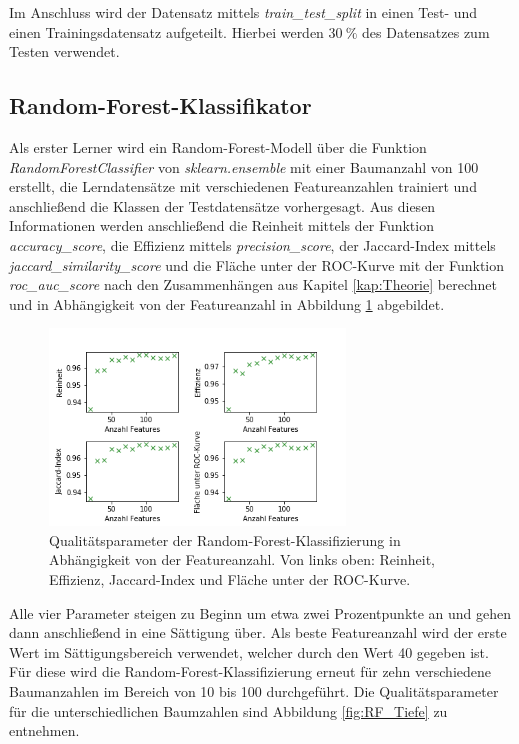 Im Anschluss wird der Datensatz mittels \textit{train\_test\_split} in einen Test- und einen Trainingsdatensatz aufgeteilt. Hierbei werden $\SI{30}{\%}$ des Datensatzes zum Testen verwendet.

\subsection{Random-Forest-Klassifikator}
Als erster Lerner wird ein Random-Forest-Modell über die Funktion \textit{RandomForestClassifier} von \textit{sklearn.ensemble} mit einer Baumanzahl von 100 erstellt, die Lerndatensätze mit verschiedenen Featureanzahlen trainiert und anschließend die Klassen der Testdatensätze vorhergesagt. Aus diesen Informationen werden anschließend die Reinheit mittels der Funktion \textit{accuracy\_score}, die Effizienz mittels \textit{precision\_score}, der Jaccard-Index mittels \textit{jaccard\_similarity\_score} und die Fläche unter der ROC-Kurve mit der Funktion \textit{roc\_auc\_score} nach den Zusammenhängen aus Kapitel \ref{kap:Theorie} berechnet und in Abhängigkeit von der Featureanzahl in Abbildung \ref{fig:RF_Feat} abgebildet.
\begin{figure}
    \centering
    \includegraphics[width=0.7\textwidth]{plots/RF_featurezahl.png}
    \caption{Qualitätsparameter der Random-Forest-Klassifizierung in Abhängigkeit von der Featureanzahl. Von links oben: Reinheit, Effizienz, Jaccard-Index und Fläche unter der ROC-Kurve.}
    \label{fig:RF_Feat}
  \end{figure}
  \FloatBarrier
  Alle vier Parameter steigen zu Beginn um etwa zwei Prozentpunkte an und gehen dann anschließend in eine Sättigung über. Als beste Featureanzahl wird der erste Wert im Sättigungsbereich verwendet, welcher durch den Wert 40 gegeben ist. Für diese wird die Random-Forest-Klassifizierung erneut für zehn verschiedene Baumanzahlen im Bereich von 10 bis 100 durchgeführt. Die Qualitätsparameter für die unterschiedlichen Baumzahlen sind Abbildung \ref{fig:RF_Tiefe} zu entnehmen.
